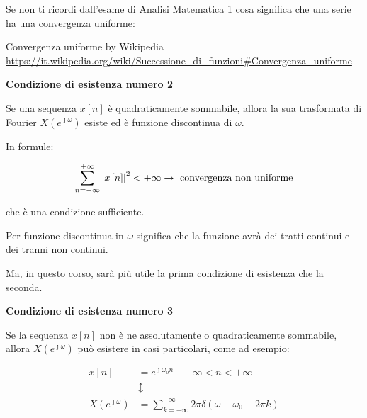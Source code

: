 \begin{tcolorbox}
    Se non ti ricordi dall'esame di Analisi Matematica 1 cosa significa che una serie ha una convergenza uniforme: \newline 

    Convergenza uniforme by Wikipedia \\
    \url{https://it.wikipedia.org/wiki/Successione_di_funzioni#Convergenza_uniforme} 
\end{tcolorbox} 

\textbf{Condizione di esistenza numero 2} \newline 

Se una sequenza $x \left[ n\right]$ è quadraticamente sommabile, 
allora la sua trasformata di Fourier $X \left( e^{\jmath \omega }\right)$ esiste ed è funzione discontinua di $\omega$. \newline 

In formule: 

{
    \Large 
    \begin{equation} 
        \sum_{n = - \infty}^{+ \infty}
        \abs{x \left[ n\right]}^{2} 
        < 
        + \infty
        \to 
        \text{ convergenza non uniforme}
    \end{equation}
} 

che è una condizione sufficiente. \newline 

\begin{tcolorbox}
Per funzione discontinua in $\omega$ significa che la funzione avrà dei tratti continui e dei tranni non continui. \newline 

Ma, in questo corso, sarà più utile la prima condizione di esistenza che la seconda. 
\end{tcolorbox}

\newpage 

\textbf{Condizione di esistenza numero 3} \newline 

Se la sequenza $x \left[ n\right]$ non è ne assolutamente o quadraticamente sommabile, 
allora $X \left( e^{\jmath \omega}\right)$ può esistere in casi particolari, come ad esempio: 

{
    \Large 
    \begin{equation}
        \begin{split}
        x \left[ n \right]  
        &= 
        e^{\jmath \omega_0 n} 
        \text{ } 
        -\infty < n < + \infty
        \\
        &\updownarrow
        \\
        X \left( e^{\jmath \omega}\right)
        &=
        \sum_{k = - \infty}^{+ \infty}
        2 \pi \delta \left( \omega - \omega_0 + 2 \pi k\right)  
        \end{split}
    \end{equation}
}


